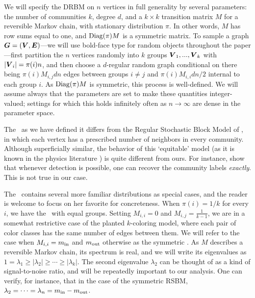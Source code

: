 We will specify the DRBM on $n$ vertices in full generality by several parameters: the number of communities $k$, degree $d$, and a $k\times k$ transition matrix $M$ for a reversible Markov chain, with stationary distribution $\pi$. In other words, $M$ has row sums equal to one, and $\operatorname{Diag}(\pi) M$ is a symmetric matrix. To sample a graph $\boldsymbol{G} = (\boldsymbol{V}, \boldsymbol{E})$---we will use bold-face type for random objects throughout the paper---first partition the $n$ vertices randomly into $k$ groups $\boldsymbol{V}_1,...,\boldsymbol{V}_k$ with $|\boldsymbol{V}_i| = \pi(i)n$, and then choose a $d$-regular random graph conditional on there being $\pi(i)M_{i,j} d n$ edges between groups $i\neq j$ and $\pi(i)M_{i,i} dn/2$ internal to each group $i$. As $\operatorname{Diag}(\pi) M$ is symmetric, this process is well-defined. We will assume always that the parameters are set to make these quantities integer-valued; settings for which this holds infinitely often as $n\to\infty$ are dense in the parameter space. 

\begin{remark}
	The \model~as we have defined it differs from the Regular Stochastic Block Model of \cite{brito2016recovery}, in which each vertex has a prescribed number of neighbors in every community. Although superficially similar, the behavior of this `equitable' model (as it is known in the physics literature \cite{newman2014equitable}) is quite different from ours. For instance, \cite{brito2016recovery} show that whenever detection is possible, one can recover the community labels \emph{exactly}. This is not true in our case.
\end{remark}

The \model~contains several more familiar distributions as special cases, and the reader is welcome to focus on her favorite for concreteness. When $\pi(i) = 1/k$ for every $i$, we have the \model~with equal groups. Setting $M_{i,i} = 0$ and $M_{i,j} = \tfrac{1}{k-1}$, we are in a somewhat restrictive case of the planted $k$-coloring model, where each pair of color classes has the same number of edges between them. We will refer to the case when $M_{i,i} = m_{\textup{in}}$ and $m_{\textup{out}}$ otherwise as the symmetric \model. As $M$ describes a reversible Markov chain, its spectrum is real, and we will write its eigenvalues as $1 = \lambda_1 \ge |\lambda_2| \ge \cdots \ge |\lambda_k|$. The second eigenvalue $\lambda_2$ can be thought of as a kind of signal-to-noise ratio, and will be repeatedly important to our analysis. One can verify, for instance, that in the case of the symmetric RSBM, $\lambda_2 = \cdots = \lambda_n = m_{\textup{in}} - m_{\textup{out}}$.

